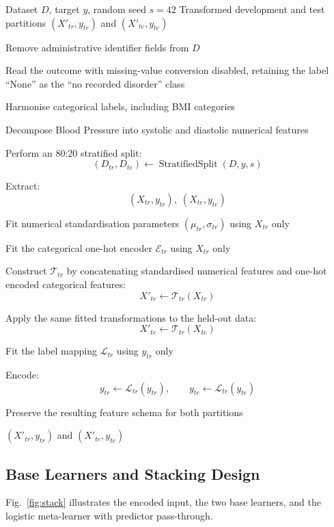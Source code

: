 \documentclass[a4paper,fleqn]{cas-dc}
\begin{document}
\begin{algorithm}[tbp]
\caption{Leakage-Controlled Data Preparation and Feature Transformation}
\label{alg:prep}
\small
\setlength{\abovedisplayskip}{3pt}
\setlength{\belowdisplayskip}{3pt}
\begin{algorithmic}[1]

\Require Dataset $D$, target $y$, random seed $s=42$
\Ensure Transformed development and test partitions
$(X'_{tr},y_{tr})$ and $(X'_{te},y_{te})$

\State Remove administrative identifier fields from $D$

\State Read the outcome with missing-value conversion disabled, retaining the label ``None'' as the
``no recorded disorder'' class

\State Harmonise categorical labels, including BMI categories

\State Decompose Blood Pressure into systolic and
diastolic numerical features

\State Perform an 80:20 stratified split:
\[
(D_{tr},D_{te})\leftarrow
\operatorname{StratifiedSplit}(D,y,s)
\]

\State Extract:
\[
(X_{tr},y_{tr}),\;(X_{te},y_{te})
\]

\State Fit numerical standardisation parameters
$(\mu_{tr},\sigma_{tr})$ using $X_{tr}$ only

\State Fit the categorical one-hot encoder
$\mathcal{E}_{tr}$ using $X_{tr}$ only

\State Construct $\mathcal{T}_{tr}$ by concatenating standardised numerical features and one-hot encoded categorical features:
\[
X'_{tr}\leftarrow\mathcal{T}_{tr}(X_{tr})
\]

\State Apply the same fitted transformations to the
held-out data:
\[
X'_{te}
\leftarrow
\mathcal{T}_{tr}(X_{te})
\]

\State Fit the label mapping $\mathcal{L}_{tr}$ using
$y_{tr}$ only

\State Encode:
\[
y_{tr}\leftarrow\mathcal{L}_{tr}(y_{tr}),
\qquad
y_{te}\leftarrow\mathcal{L}_{tr}(y_{te})
\]

\State Preserve the resulting feature schema for both partitions

\State \Return
$(X'_{tr},y_{tr})$ and $(X'_{te},y_{te})$

\end{algorithmic}
\end{algorithm}


\subsection{Base Learners and Stacking Design}
\label{sec:architecture}
Fig.~\ref{fig:stack} illustrates the encoded input, the two base learners, and the logistic meta-learner with predictor pass-through.
\end{document}
